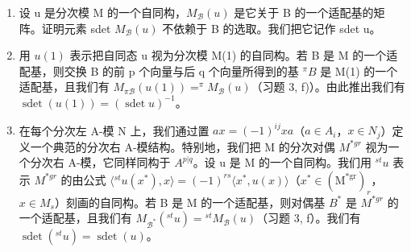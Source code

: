 \begin{enumerate}
\def\labelenumi{\alph{enumi})}
\item
  设 u 是分次模 M 的一个自同构，\(M_{\mathcal{B}}(u)\) 是它关于 B 的一个适配基的矩阵。证明元素 sdet \(M_{\mathcal{B}}(u)\) 不依赖于 B 的选取。我们把它记作 sdet u。
\item
  用 \(u(1)\) 表示把自同态 u 视为分次模 M(1) 的自同构。若 B 是 M 的一个适配基，则交换 B 的前 p 个向量与后 q 个向量所得到的基 \(^{\pi}B\) 是 M(1) 的一个适配基，且我们有 \(M_{\pi\mathcal{B}}(u(1)) = ^{\pi}M_{\mathcal{B}}(u)\)（习题 3, f)）。由此推出我们有 \(\operatorname{sdet}(u(1)) = (\operatorname{sdet} u)^{-1}\)。
\item
  在每个分次左 A-模 N 上，我们通过置 \(ax = (-1)^{ij}xa\)（\(a \in A_i\)，\(x \in N_j\)）定义一个典范的分次右 A-模结构。特别地，我们把 M 的分次对偶 \(M^{*gr}\) 视为一个分次右 A-模，它同样同构于 \(A^{p|q}\)。设 u 是 M 的一个自同构。我们用 \({}^{st}u\) 表示 \(M^{*gr}\) 的由公式 \(\langle{}^{st}u(x^{*}), x\rangle = (-1)^{rs}\langle x^{*}, u(x)\rangle\)（\(x^{*} \in (\mathrm{M}^{*\mathrm{gr}})_r\)，\(x \in M_s\)）刻画的自同构。若 B 是 M 的一个适配基，则对偶基 \(B^*\) 是 \(M^{*gr}\) 的一个适配基，且我们有 \(M_{\mathcal{B}^*}({}^{st}u) = {}^{st}M_{\mathcal{B}}(u)\)（习题 3, f）。我们有 \(\operatorname{sdet}({}^{st}u) = \operatorname{sdet}(u)\)。
\end{enumerate}


